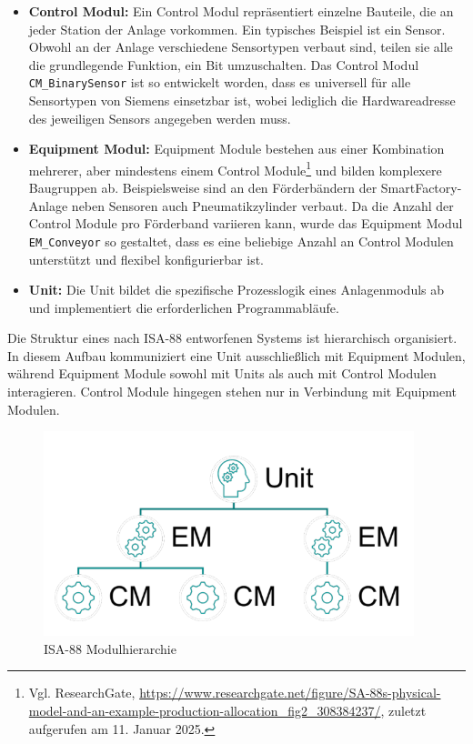 \sloppy
\begin{itemize}
    \item \textbf{Control Modul:} Ein Control Modul repräsentiert einzelne Bauteile, die an jeder Station der Anlage
    vorkommen. Ein typisches Beispiel ist ein Sensor. Obwohl an der Anlage verschiedene Sensortypen verbaut sind, teilen 
    sie alle die grundlegende Funktion, ein Bit umzuschalten. Das Control Modul \texttt{CM\_BinarySensor} ist so entwickelt 
    worden, dass es universell für alle Sensortypen von Siemens einsetzbar ist, wobei lediglich die Hardwareadresse des jeweiligen 
    Sensors angegeben werden muss.

    \item \textbf{Equipment Modul:} Equipment Module bestehen aus einer Kombination mehrerer, aber mindestens einem Control Module\footnote{Vgl. ResearchGate, \url{https://www.researchgate.net/figure/SA-88s-physical-model-and-an-example-production-allocation_fig2_308384237/}, zuletzt aufgerufen am 11. Januar 2025.}
    und bilden komplexere Baugruppen ab. Beispielsweise sind an den Förderbändern der SmartFactory-Anlage neben Sensoren auch 
    Pneumatikzylinder verbaut. Da die Anzahl der Control Module pro Förderband variieren kann, wurde das Equipment Modul 
    \texttt{EM\_Conveyor} so gestaltet, dass es eine beliebige Anzahl an Control Modulen unterstützt und flexibel 
    konfigurierbar ist.

    \item \textbf{Unit:} Die Unit bildet die spezifische Prozesslogik eines Anlagenmoduls ab und implementiert die 
    erforderlichen Programmabläufe.
\end{itemize}

Die Struktur eines nach ISA-88 entworfenen Systems ist hierarchisch organisiert. In diesem Aufbau kommuniziert eine Unit 
ausschließlich mit Equipment Modulen, während Equipment Module sowohl mit Units als auch mit Control Modulen interagieren. 
Control Module hingegen stehen nur in Verbindung mit Equipment Modulen.

\begin{figure}[h!]
    \centering
    \includegraphics*{figures/Screenshot 2025-01-03 201917.png}
    \caption{ISA-88 Modulhierarchie\cite{siemens2022}} %
    \label{fig:isa88-modulhierarchie} %
\end{figure}
\FloatBarrier